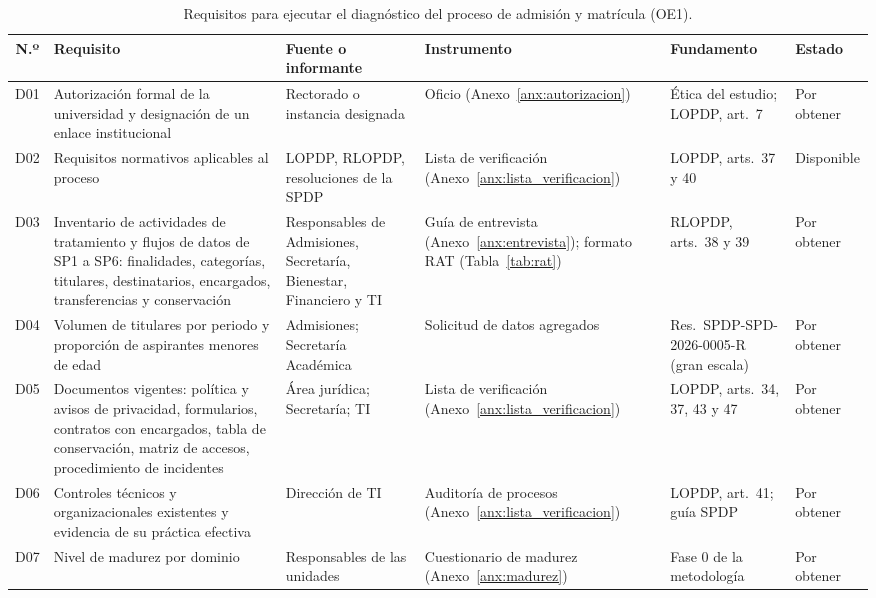 \begin{table}[htbp]
  \centering
  \caption{Requisitos para ejecutar el diagnóstico del proceso de admisión y matrícula (OE1).}
  \label{tab:requisitos_diagnostico}
  \scriptsize
  \renewcommand{\arraystretch}{1.2}
  \begin{tabularx}{\textwidth}{|c|L|>{\raggedright\arraybackslash}p{2.4cm}|>{\raggedright\arraybackslash}p{2.2cm}|>{\raggedright\arraybackslash}p{2.2cm}|>{\raggedright\arraybackslash}p{1.5cm}|}
    \hline
    \textbf{N.º} & \textbf{Requisito} & \textbf{Fuente o informante} & \textbf{Instrumento} & \textbf{Fundamento} & \textbf{Estado} \\
    \hline
    D01 & Autorización formal de la universidad y designación de un enlace institucional & Rectorado o instancia designada & Oficio (Anexo~\ref{anx:autorizacion}) & Ética del estudio; LOPDP, art.~7 & Por obtener \\
    \hline
    D02 & Requisitos normativos aplicables al proceso & LOPDP, RLOPDP, resoluciones de la SPDP & Lista de verificación (Anexo~\ref{anx:lista_verificacion}) & LOPDP, arts.~37 y 40 & Disponible \\
    \hline
    D03 & Inventario de actividades de tratamiento y flujos de datos de SP1 a SP6: finalidades, categorías, titulares, destinatarios, encargados, transferencias y conservación & Responsables de Admisiones, Secretaría, Bienestar, Financiero y TI & Guía de entrevista (Anexo~\ref{anx:entrevista}); formato RAT (Tabla~\ref{tab:rat}) & RLOPDP, arts.~38 y 39 & Por obtener \\
    \hline
    D04 & Volumen de titulares por periodo y proporción de aspirantes menores de edad & Admisiones; Secretaría Académica & Solicitud de datos agregados & Res.~SPDP-SPD-2026-0005-R (gran escala) & Por obtener \\
    \hline
    D05 & Documentos vigentes: política y avisos de privacidad, formularios, contratos con encargados, tabla de conservación, matriz de accesos, procedimiento de incidentes & Área jurídica; Secretaría; TI & Lista de verificación (Anexo~\ref{anx:lista_verificacion}) & LOPDP, arts.~34, 37, 43 y 47 & Por obtener \\
    \hline
    D06 & Controles técnicos y organizacionales existentes y evidencia de su práctica efectiva & Dirección de TI & Auditoría de procesos (Anexo~\ref{anx:lista_verificacion}) & LOPDP, art.~41; guía SPDP & Por obtener \\
    \hline
    D07 & Nivel de madurez por dominio & Responsables de las unidades & Cuestionario de madurez (Anexo~\ref{anx:madurez}) & Fase 0 de la metodología & Por obtener \\

\end{tabularx}
\end{table}
